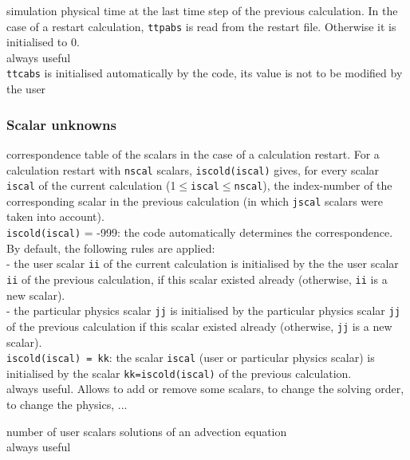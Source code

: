 {simulation physical time at the last time step of the previous
calculation. In the case of a restart calculation, {\tt ttpabs} is read from
the restart file. Otherwise it is initialised to 0.\\
always useful\\
{\tt ttcabs} is initialised automatically by the code, its value is not to
be modified by the user}

\subsubsection{Scalar unknowns}


{correspondence table of the scalars in the case of a calculation
restart. For a calculation restart with {\tt nscal} scalars, {\tt iscold(iscal)}
gives, for every scalar {\tt iscal} of the current calculation
(1$\leqslant${\tt iscal}$\leqslant${\tt nscal}), the index-number of the
corresponding scalar in the previous calculation (in which {\tt jscal} scalars were
taken into account).\\
\hspace*{1.3cm} {\tt iscold(iscal)} = -999: the code automatically determines the
correspondence. By default, the following rules are applied:\\
\hspace*{2.cm} - the user scalar {\tt ii} of the current calculation is
initialised by the the user scalar {\tt ii} of the previous calculation, if
this scalar existed already (otherwise, {\tt ii} is a new scalar).\\
\hspace*{2.cm} - the particular physics scalar {\tt jj} is initialised by
the particular physics scalar {\tt jj} of the previous calculation if this
scalar existed already (otherwise, {\tt jj} is a new scalar).\\
\hspace*{1.3cm} {\tt iscold(iscal) = kk}: the scalar {\tt iscal} (user or particular
physics scalar) is initialised by the scalar {\tt kk=iscold(iscal)} of the
previous calculation.\\
always useful. Allows to add or remove some scalars, to change the
solving order, to change the physics, ...}

{number of user scalars solutions of an advection equation\\
always useful}

